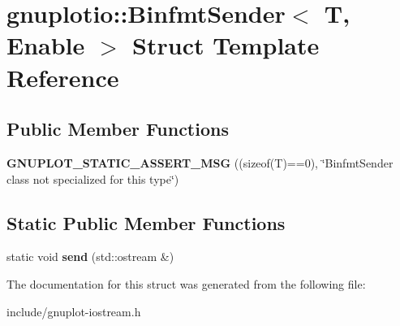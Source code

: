 \hypertarget{structgnuplotio_1_1BinfmtSender}{}\section{gnuplotio\+:\+:Binfmt\+Sender$<$ T, Enable $>$ Struct Template Reference}
\label{structgnuplotio_1_1BinfmtSender}
\subsection*{Public Member Functions}
\begin{DoxyCompactItemize}
\item 
\mbox{\label{structgnuplotio_1_1BinfmtSender_a02d7d348067625dc099e27249c24780a}} 
{\bfseries G\+N\+U\+P\+L\+O\+T\+\_\+\+S\+T\+A\+T\+I\+C\+\_\+\+A\+S\+S\+E\+R\+T\+\_\+\+M\+SG} ((sizeof(T)==0), \char`\"{}Binfmt\+Sender class not specialized for this type\char`\"{})
\end{DoxyCompactItemize}
\subsection*{Static Public Member Functions}
\begin{DoxyCompactItemize}
\item 
\mbox{\label{structgnuplotio_1_1BinfmtSender_a762010e3172c02e981252f93185b29c8}} 
static void {\bfseries send} (std\+::ostream \&)
\end{DoxyCompactItemize}


The documentation for this struct was generated from the following file\+:\begin{DoxyCompactItemize}
\item 
include/gnuplot-\/iostream.\+h\end{DoxyCompactItemize}
